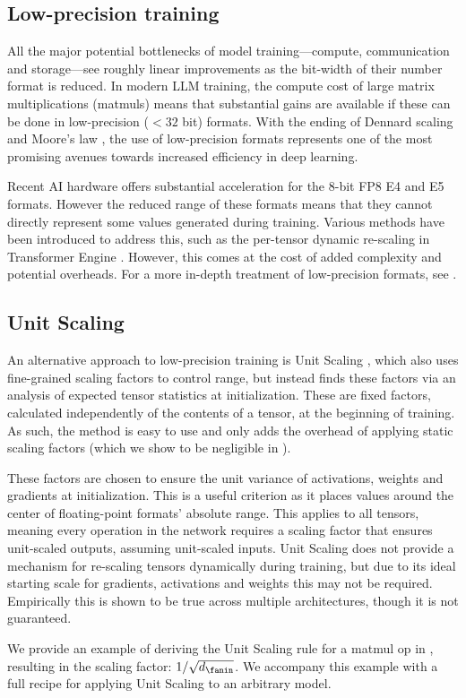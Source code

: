 \subsection{Low-precision training} \label{sec:background:low_precision_training}

All the major potential bottlenecks of model training---compute, communication and storage---see roughly linear improvements as the bit-width of their number format is reduced.
In modern LLM training, the compute cost of large matrix multiplications (matmuls) means that substantial gains are available if these can be done in low-precision ($<32$ bit) formats.
With the ending of Dennard scaling and Moore's law \citep{Moores_Law_A,Moores_Law_B}, the use of low-precision formats represents one of the most promising avenues towards increased efficiency in deep learning.

Recent AI hardware offers substantial acceleration for the 8-bit FP8 E4 and E5 formats. However the reduced range of these formats means that they cannot directly represent some values generated during training. Various methods have been introduced to address this, such as the per-tensor dynamic re-scaling in Transformer Engine \citep{Transformer_Engine}. However, this comes at the cost of added complexity and potential overheads. For a more in-depth treatment of low-precision formats, see .

\subsection{Unit Scaling} \label{sec:background:unit_scaling}

An alternative approach to low-precision training is Unit Scaling \citep{Unit_Scaling}, which also uses fine-grained scaling factors to control range, but instead finds these factors via an analysis of expected tensor statistics at initialization. These are fixed factors, calculated independently of the contents of a tensor, at the beginning of training. As such, the method is easy to use and only adds the overhead of applying static scaling factors (which we show to be negligible in ).

These factors are chosen to ensure the unit variance of activations, weights and gradients at initialization.
This is a useful criterion as it places values around the center of floating-point formats' absolute range. This applies to all tensors, meaning every operation in the network requires a scaling factor that ensures unit-scaled outputs, assuming unit-scaled inputs. Unit Scaling does not provide a mechanism for re-scaling tensors dynamically during training, but due to its ideal starting scale for gradients, activations and weights this may not be required. Empirically this is shown to be true across multiple architectures, though it is not guaranteed.

We provide an example of deriving the Unit Scaling rule for a matmul op in , resulting in the scaling factor: $1 / \sqrt{d_\fanin}$. We accompany this example with a full recipe for applying Unit Scaling to an arbitrary model.

